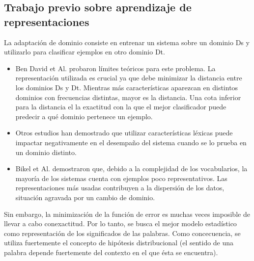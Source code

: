 \documentclass[11pt,spanish]{article}
\begin{document}
\subsection{Trabajo previo sobre aprendizaje de representaciones}
La adaptación de dominio consiste en entrenar un sistema sobre un dominio Ds y utilizarlo para clasificar ejemplos en otro dominio Dt.
\begin{itemize}
	\item Ben David et Al. probaron límites teóricos para este problema. La representación utilizada es crucial ya que debe minimizar la distancia entre los dominios Ds y Dt. Mientras más características aparezcan en distintos dominios con frecuencias distintas, mayor es la distancia. Una cota inferior para la distancia el la exactitud con la que el mejor clasificador puede predecir a qué dominio pertenece un ejemplo.
	\item Otros estudios han demostrado que utilizar características léxicas puede impactar negativamente en el desempaño del sistema cuando se lo prueba en un dominio distinto.
	\item Bikel et Al. demostraron que, debido a la complejidad de los vocabularios, la mayoría de los sistemas cuenta con ejemplos poco representativos. Las representaciones más usadas contribuyen a la dispersión de los datos, situación agravada por un cambio de dominio.
\end{itemize}
Sin embargo, la minimización de la función de error es muchas veces imposible de llevar a cabo conexactitud. Por lo tanto, se busca el mejor modelo estadístico como representación de los significados de las palabras. Como concecuencia, se utiliza fuertemente el concepto de hipótesis distribucional (el sentido de una palabra depende fuertemente del contexto en el que ésta se encuentra).
\end{document}
